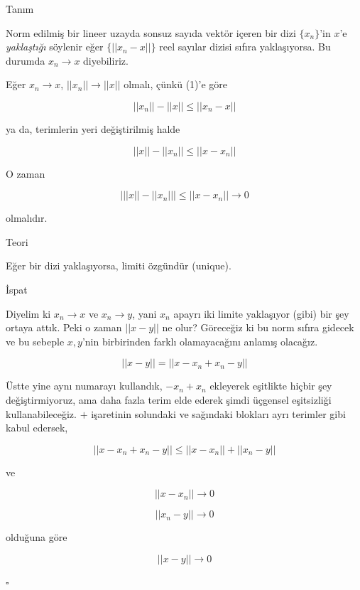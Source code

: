\documentclass[12pt,fleqn]{article}\usepackage{../../common}
\begin{document}
Tanım 

Norm edilmiş bir lineer uzayda sonsuz sayıda vektör içeren bir dizi
$\{x_n\}$'in $x$'e {\em yaklaştığı} söylenir eğer $\{||x_n-x||\}$ reel
sayılar dizisi sıfıra yaklaşıyorsa. Bu durumda $x_n \to x$ diyebiliriz.

Eğer $x_n \to x$, $||x_n|| \to ||x||$ olmalı, çünkü (1)'e göre 

$$ ||x_n||  - ||x|| \le ||x_n-x|| $$

ya da, terimlerin yeri değiştirilmiş halde

$$ ||x||  - ||x_n|| \le ||x-x_n|| $$

O zaman 

$$ \bigg| ||x||  - ||x_n|| \bigg|  \le ||x-x_n|| \to 0$$

olmalıdır. 

Teori 

Eğer bir dizi yaklaşıyorsa, limiti özgündür (unique).

İspat

Diyelim ki $x_n \to x$ ve $x_n \to y$, yani $x_n$ apayrı iki limite
yaklaşıyor (gibi) bir şey ortaya attık. Peki o zaman $||x-y||$ ne olur?
Göreceğiz ki bu norm sıfıra gidecek ve bu sebeple $x,y$'nin birbirinden
farklı olamayacağını anlamış olacağız. 

$$ ||x-y|| =  ||x-x_n + x_n-y|| $$

Üstte yine aynı numarayı kullandık, $-x_n+x_n$ ekleyerek eşitlikte hiçbir
şey değiştirmiyoruz, ama daha fazla terim elde ederek şimdi üçgensel
eşitsizliği kullanabileceğiz. $+$ işaretinin solundaki ve sağındaki
blokları ayrı terimler gibi kabul edersek, 

$$ ||x-x_n + x_n-y|| \le ||x-x_n || + ||x_n-y|| $$

ve

$$ ||x-x_n || \to 0 $$

$$ ||x_n-y|| \to 0$$

olduğuna göre 

$$  ||x-y|| \to 0 $$ 

$\square$
\end{document}
